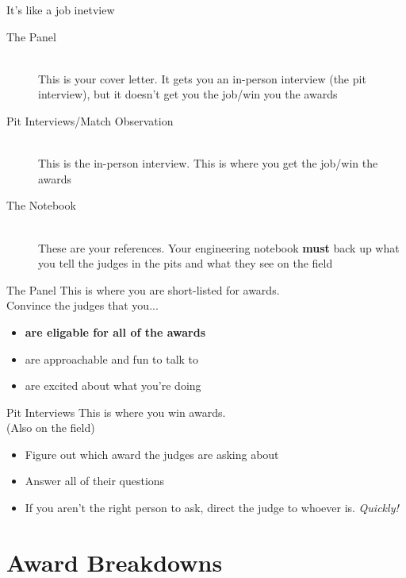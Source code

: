 \documentclass{beamer}
\begin{document}
  \begin{frame}{It's like a job inetview}
    \begin{description}
    \item[The Panel] \hfill \\
      This is your cover letter. It gets you an in-person interview
      (the pit interview), but it doesn't get you the job/win you the awards
      \pause
    \item[Pit Interviews/Match Observation] \hfill \\
      This is the in-person interview. This is where you get the job/win
      the awards
      \pause
    \item[The Notebook] \hfill \\
      These are your references. Your engineering notebook \textbf{must}
      back up what you tell the judges in the pits and what they see
      on the field
    \end{description}
  \end{frame}

  \begin{frame}{The Panel}
    \large{This is where you are short-listed for awards.}
    \\
    \pause
    Convince the judges that you... \pause
    \begin{itemize}
    \item \textbf{are eligable for all of the awards} \pause
    \item are approachable and fun to talk to \pause
    \item are excited about what you're doing
    \end{itemize}
  \end{frame}

  \begin{frame}{Pit Interviews}
    \large{This is where you win awards.}
    \\
    \pause
    \small{(Also on the field)}
    \pause
    \begin{itemize}
    \item Figure out which award the judges are asking about \pause
    \item Answer all of their questions \pause
    \item If you aren't the right person to ask, direct the judge to whoever is.
      \pause
      \textit{Quickly!}
    \end{itemize}
  \end{frame}

  \section{Award Breakdowns}
\end{document}
